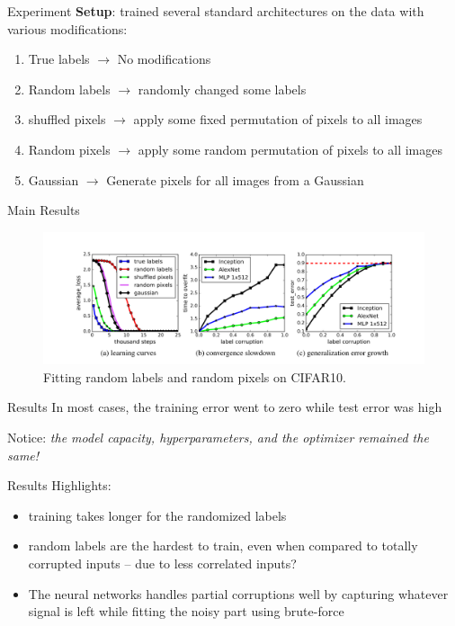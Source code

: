 \documentclass[10pt]{beamer}
\begin{document}
\begin{frame}{Experiment}
	\textbf{Setup}: trained several standard architectures on the data with various modifications:
	\begin{enumerate}
		\item True labels $\rightarrow$ No modifications
		\item Random labels $\rightarrow$ randomly changed some labels
		\item shuffled pixels $\rightarrow$ apply some fixed permutation of pixels to all images
		\item Random pixels $\rightarrow$ apply some random permutation of pixels to all images
		\item Gaussian $\rightarrow$ Generate pixels for all images from a Gaussian
	\end{enumerate}

\end{frame}

\begin{frame}{Main Results}
		\begin{figure}
			\centering
		\centering
		\includegraphics[width=\linewidth]{fig1c}
		\caption{Fitting random labels and random pixels on CIFAR10.}
		\label{fig:corruptlabels}
		\end{figure}
\end{frame}

\begin{frame}{Results}
	In most cases, the training error went to zero while test error was high
	
	\begin{alertblock}{Notice:}
		\emph{the model capacity, hyperparameters, and the optimizer remained the same!}
	\end{alertblock}

\end{frame}

\begin{frame}{Results}
	Highlights:
	\begin{itemize}
		\item training takes longer for the randomized labels
		\item random labels are the hardest to train, even when compared to totally corrupted inputs -- due to less correlated inputs?
		\item The neural networks handles partial corruptions well by capturing whatever signal is left while fitting the noisy part using brute-force
	\end{itemize}
	
\end{frame}
\end{document}
